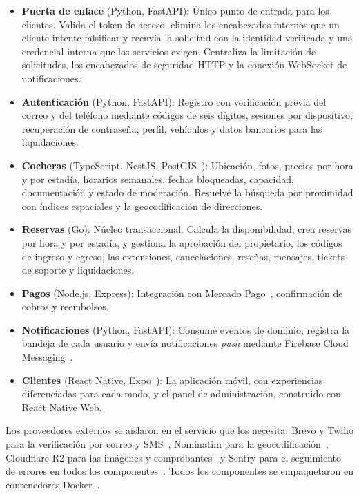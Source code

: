\documentclass[conference,a4paper]{IEEEtran}
\begin{document}
\begin{itemize}
    \item \textbf{Puerta de enlace} (Python, FastAPI): Único punto de entrada para los clientes. Valida el token de acceso, elimina los encabezados internos que un cliente intente falsificar y reenvía la solicitud con la identidad verificada y una credencial interna que los servicios exigen. Centraliza la limitación de solicitudes, los encabezados de seguridad HTTP y la conexión WebSocket de notificaciones.
    \item \textbf{Autenticación} (Python, FastAPI): Registro con verificación previa del correo y del teléfono mediante códigos de seis dígitos, sesiones por dispositivo, recuperación de contraseña, perfil, vehículos y datos bancarios para las liquidaciones.
    \item \textbf{Cocheras} (TypeScript, NestJS, PostGIS~\cite{postgis}): Ubicación, fotos, precios por hora y por estadía, horarios semanales, fechas bloqueadas, capacidad, documentación y estado de moderación. Resuelve la búsqueda por proximidad con índices espaciales y la geocodificación de direcciones.
    \item \textbf{Reservas} (Go): Núcleo transaccional. Calcula la disponibilidad, crea reservas por hora y por estadía, y gestiona la aprobación del propietario, los códigos de ingreso y egreso, las extensiones, cancelaciones, reseñas, mensajes, tickets de soporte y liquidaciones.
    \item \textbf{Pagos} (Node.js, Express): Integración con Mercado Pago~\cite{mercadopago}, confirmación de cobros y reembolsos.
    \item \textbf{Notificaciones} (Python, FastAPI): Consume eventos de dominio, registra la bandeja de cada usuario y envía notificaciones \textit{push} mediante Firebase Cloud Messaging~\cite{firebase}.
    \item \textbf{Clientes} (React Native, Expo~\cite{reactnative,expo}): La aplicación móvil, con experiencias diferenciadas para cada modo, y el panel de administración, construido con React Native Web.
\end{itemize}

Los proveedores externos se aislaron en el servicio que los necesita: Brevo y Twilio para la verificación por correo y SMS~\cite{brevo,twilio}, Nominatim para la geocodificación~\cite{nominatim}, Cloudflare R2 para las imágenes y comprobantes~\cite{cloudflarer2} y Sentry para el seguimiento de errores en todos los componentes~\cite{sentry}. Todos los componentes se empaquetaron en contenedores Docker~\cite{docker}.
\end{document}
